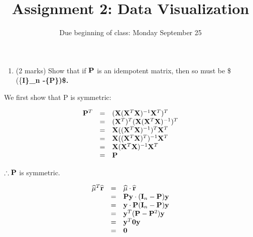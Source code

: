 \documentclass[9pt,letter]{article}
\title{Assignment 2: Data Visualization}
\subtitle{Due beginning of class: Monday September 25}
\author{}
\date{}
\providecommand{\tightlist}{%
  \setlength{\itemsep}{0pt}\setlength{\parskip}{0pt}}
\begin{document}
\maketitle

\begin{enumerate}
\def\labelenumi{(\alph{enumi})}
\setcounter{enumi}{2}
\tightlist
\item
  (2 marks) Show that if \({\bf P}\) is an idempotent matrix, then so
  must be \$ (\{\bf I\}\_n -\{\bf P\})\$.
\end{enumerate}

We first show that P is symmetric:

\[
\begin{array}{rcl}
{\bf P}^T &=& ({\bf X} ({\bf X}^T {\bf X})^{-1}{\bf X}^T)^T\\
&=& ({\bf X}^T)^T({\bf X} ({\bf X}^T {\bf X})^{-1})^T\\
&=& {\bf X}(({\bf X}^T {\bf X})^{-1})^T{\bf X}^T\\
&=& {\bf X}(({\bf X}^T {\bf X})^T)^{-1}{\bf X}^T\\
&=& {\bf X}({\bf X}^T {\bf X})^{-1}{\bf X}^T\\
&=& {\bf P}
\end{array}
\]

\(\therefore {\bf P}\) is symmetric.

\[
\begin{array}{rcl}
\widehat{\bf \mu}^T \widehat{\bf r} &= & \widehat{\bf \mu} \cdot \widehat{\bf r}\\
&= & {\bf P}{\bf y} \cdot ({\bf I}_n-{\bf P}){\bf y}\\
&= & {\bf y} \cdot{\bf P} ({\bf I}_n-{\bf P}){\bf y} \\
&= & {\bf y}^T({\bf P}-{\bf P}^2){\bf y}\\
&= & {\bf y}^T{\bf 0}{\bf y} \\
&= & {\bf 0} \\
\end{array}
\]
\end{document}
